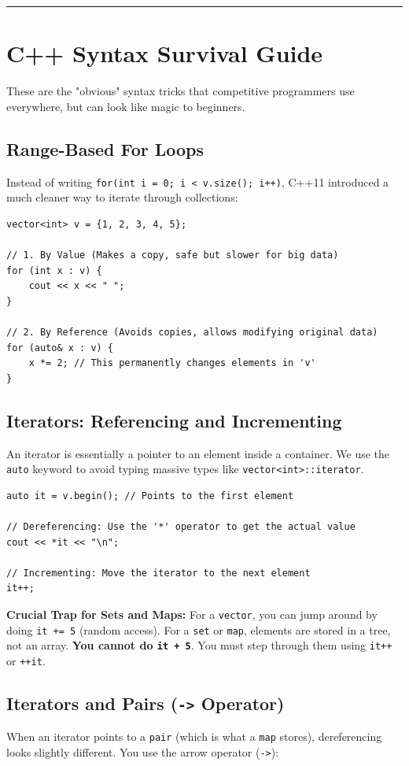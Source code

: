 \documentclass[12pt, a4paper]{article}
\begin{document}
\vspace{0.5cm}
\hrule

\section{C++ Syntax Survival Guide}
These are the "obvious" syntax tricks that competitive programmers use everywhere, but can look like magic to beginners.

\subsection{Range-Based For Loops}
Instead of writing \texttt{for(int i = 0; i < v.size(); i++)}, C++11 introduced a much cleaner way to iterate through collections:

\begin{lstlisting}
vector<int> v = {1, 2, 3, 4, 5};

// 1. By Value (Makes a copy, safe but slower for big data)
for (int x : v) {
    cout << x << " "; 
}

// 2. By Reference (Avoids copies, allows modifying original data)
for (auto& x : v) {
    x *= 2; // This permanently changes elements in 'v'
}
\end{lstlisting}

\subsection{Iterators: Referencing and Incrementing}
An iterator is essentially a pointer to an element inside a container. We use the \texttt{auto} keyword to avoid typing massive types like \texttt{vector<int>::iterator}.

\begin{lstlisting}
auto it = v.begin(); // Points to the first element

// Dereferencing: Use the '*' operator to get the actual value
cout << *it << "\n"; 

// Incrementing: Move the iterator to the next element
it++; 
\end{lstlisting}

\textbf{Crucial Trap for Sets and Maps:} 
For a \texttt{vector}, you can jump around by doing \texttt{it += 5} (random access). For a \texttt{set} or \texttt{map}, elements are stored in a tree, not an array. \textbf{You cannot do \texttt{it + 5}}. You must step through them using \texttt{it++} or \texttt{++it}.

\subsection{Iterators and Pairs (\texttt{->} Operator)}
When an iterator points to a \texttt{pair} (which is what a \texttt{map} stores), dereferencing looks slightly different. You use the arrow operator (\texttt{->}):
\end{document}
